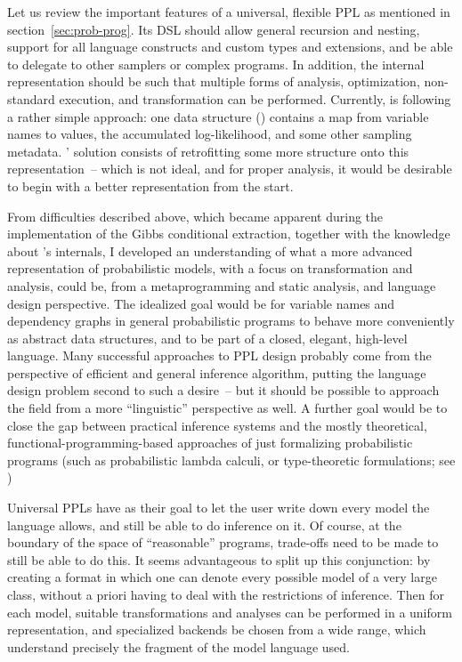Let us review the important features of a universal, flexible PPL as mentioned in
section~\ref{sec:prob-prog}.  Its DSL should allow general recursion and nesting, support for all
language constructs and custom types and extensions, and be able to delegate to other samplers or
complex programs.  In addition, the internal representation should be such that multiple forms of
analysis, optimization, non-standard execution, and transformation can be performed.  Currently,
\turingjl{} is following a rather simple approach: one data structure () contains a
map from variable names to values, the accumulated log-likelihood, and some other sampling
metadata. \autogibbsjl{}' solution consists of retrofitting some more structure onto this
representation~-- which is not ideal, and for proper analysis, it would be desirable to begin with a
better representation from the start.

From difficulties described above, which became apparent during the implementation of the Gibbs
conditional extraction, together with the knowledge about \dppljl{}'s internals, I developed an
understanding of what a more advanced representation of probabilistic models, with a focus on
transformation and analysis, could be, from a metaprogramming and static analysis, and language
design perspective.  The idealized goal would be for variable names and dependency graphs in general
probabilistic programs to behave more conveniently as abstract data structures, and to be part of a
closed, elegant, high-level language.  Many successful approaches to PPL design probably come from
the perspective of efficient and general inference algorithm, putting the language design problem
second to such a desire~-- but it should be possible to approach the field from a more
\enquote{linguistic} perspective as well.  A further goal would be to close the gap between
practical inference systems and the mostly theoretical, functional-programming-based approaches of
just formalizing probabilistic programs (such as probabilistic lambda calculi, or type-theoretic
formulations; see
\textcite{ramsey2002stochastic,heunen2017convenient,bhat2012type,scibior2015practical})

Universal PPLs have as their goal to let the user write down every model the language allows, and
still be able to do inference on it.  Of course, at the boundary of the space of
\enquote{reasonable} programs, trade-offs need to be made to still be able to do this.  It seems
advantageous to split up this conjunction: by creating a format in which one can denote every
possible model of a very large class, without a priori having to deal with the restrictions of
inference.  Then for each model, suitable transformations and analyses can be performed in a uniform
representation, and specialized backends be chosen from a wide range, which understand precisely the
fragment of the model language used.

